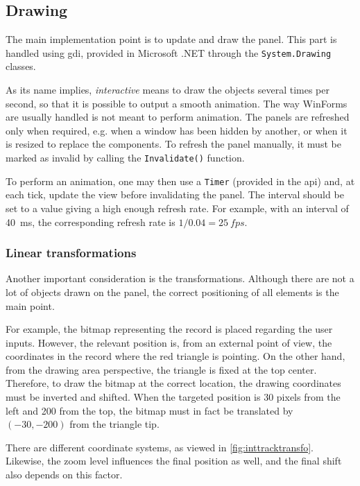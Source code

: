\subsection{Drawing}
\label{sec:intdrawing}

The main implementation point is to update and draw the panel. This part is handled using \gls{gdi}, provided in Microsoft .NET through the \texttt{System.Drawing} classes.

As its name implies, \emph{interactive} means to draw the objects several times per second, so that it is possible to output a smooth animation. The way WinForms are usually handled is not meant to perform animation. The panels are refreshed only when required, e.g. when a window has been hidden by another, or when it is resized to replace the components. To refresh the panel manually, it must be marked as invalid by calling the \texttt{Invalidate()} function.

To perform an animation, one may then use a \texttt{Timer} (provided in the \gls{api}) and, at each tick, update the view before invalidating the panel. The interval should be set to a value giving a high enough refresh rate. For example, with an interval of \SI{40}{\milli\second}, the corresponding refresh rate is $1/0.04 = \SI{25}{fps}$.

\subsubsection{Linear transformations}

Another important consideration is the transformations. Although there are not a lot of objects drawn on the panel, the correct positioning of all elements is the main point.

For example, the bitmap representing the record is placed regarding the user inputs. However, the relevant position is, from an external point of view, the coordinates in the record where the red triangle is pointing. On the other hand, from the drawing area perspective, the triangle is fixed at the top center. Therefore, to draw the bitmap at the correct location, the drawing coordinates must be inverted and shifted. When the targeted position is 30 pixels from the left and 200 from the top, the bitmap must in fact be translated by $(-30,-200)$ from the triangle tip.

There are different coordinate systems, as viewed in \autoref{fig:inttracktransfo}. Likewise, the zoom level influences the final position as well, and the final shift also depends on this factor.

